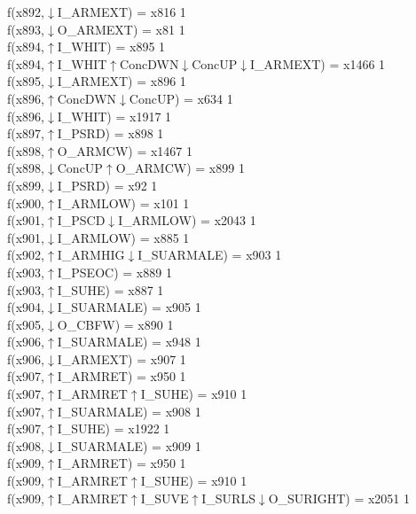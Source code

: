 f(x892,$\downarrow$I\_ARMEXT) = x816 {1} \\
f(x893,$\downarrow$O\_ARMEXT) = x81 {1} \\
f(x894,$\uparrow$I\_WHIT) = x895 {1} \\
f(x894,$\uparrow$I\_WHIT$\uparrow$ConcDWN$\downarrow$ConcUP$\downarrow$I\_ARMEXT) = x1466 {1} \\
f(x895,$\downarrow$I\_ARMEXT) = x896 {1} \\
f(x896,$\uparrow$ConcDWN$\downarrow$ConcUP) = x634 {1} \\
f(x896,$\downarrow$I\_WHIT) = x1917 {1} \\
f(x897,$\uparrow$I\_PSRD) = x898 {1} \\
f(x898,$\uparrow$O\_ARMCW) = x1467 {1} \\
f(x898,$\downarrow$ConcUP$\uparrow$O\_ARMCW) = x899 {1} \\
f(x899,$\downarrow$I\_PSRD) = x92 {1} \\
f(x900,$\uparrow$I\_ARMLOW) = x101 {1} \\
f(x901,$\uparrow$I\_PSCD$\downarrow$I\_ARMLOW) = x2043 {1} \\
f(x901,$\downarrow$I\_ARMLOW) = x885 {1} \\
f(x902,$\uparrow$I\_ARMHIG$\downarrow$I\_SUARMALE) = x903 {1} \\
f(x903,$\uparrow$I\_PSEOC) = x889 {1} \\
f(x903,$\uparrow$I\_SUHE) = x887 {1} \\
f(x904,$\downarrow$I\_SUARMALE) = x905 {1} \\
f(x905,$\downarrow$O\_CBFW) = x890 {1} \\
f(x906,$\uparrow$I\_SUARMALE) = x948 {1} \\
f(x906,$\downarrow$I\_ARMEXT) = x907 {1} \\
f(x907,$\uparrow$I\_ARMRET) = x950 {1} \\
f(x907,$\uparrow$I\_ARMRET$\uparrow$I\_SUHE) = x910 {1} \\
f(x907,$\uparrow$I\_SUARMALE) = x908 {1} \\
f(x907,$\uparrow$I\_SUHE) = x1922 {1} \\
f(x908,$\downarrow$I\_SUARMALE) = x909 {1} \\
f(x909,$\uparrow$I\_ARMRET) = x950 {1} \\
f(x909,$\uparrow$I\_ARMRET$\uparrow$I\_SUHE) = x910 {1} \\
f(x909,$\uparrow$I\_ARMRET$\uparrow$I\_SUVE$\uparrow$I\_SURLS$\downarrow$O\_SURIGHT) = x2051 {1} \\
